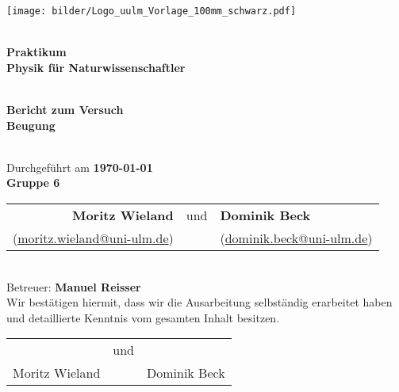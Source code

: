 \documentclass[11pt]{betterallrounder}
\begin{document}
\begin{titlepage}

    \begin{center}

        \begin{minipage}{\textwidth}
            \begin{center}
                \texttt{[image: bilder/Logo\_uulm\_Vorlage\_100mm\_schwarz.pdf]}
            \end{center}
        \end{minipage}
    
        \textsc{\Large }\\[1.5cm]
        
        {\huge \bfseries Praktikum\\[0.5cm]}
        {\huge \bfseries Physik für Naturwissenschaftler}

        \textsc{\Large }\\[1.5cm]

        {\large \bfseries Bericht zum Versuch}\\[0.5cm]
        
        {\huge \bfseries Beugung\\[0.4cm]}

        \textsc{\Large }\\[1.5cm]

        {\large Durchgeführt am \bfseries{\today}}\\[1cm]
        
        {\huge \bfseries Gruppe 6\\[0.4cm]}

        \Large
        \begin{tabular}{rcl}
            \bfseries{Moritz Wieland} & und & \bfseries{Dominik Beck}\\
            (\href{mailto:moritz.wieland@uni-ulm.de}{moritz.wieland@uni-ulm.de}) & & (\href{mailto:dominik.beck@uni-ulm.de}{dominik.beck@uni-ulm.de})
        \end{tabular}

        \textsc{\huge }\\[1cm]

        {\large Betreuer: \bfseries{Manuel Reisser}}\\[1cm]

        {\large Wir bestätigen hiermit, dass wir die Ausarbeitung selbständig erarbeitet haben und
        detaillierte Kenntnis vom gesamten Inhalt besitzen.}\\[1cm]

        \begin{tabular}{rcl}
            \hrulefill & und & \hrulefill\\
            Moritz Wieland & & Dominik Beck
        \end{tabular}
    
        \vfill
    \end{center}
\end{titlepage}


\newpage

\tableofcontents




% 
% 
\end{document}

